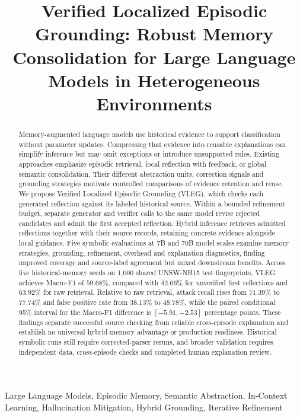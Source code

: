 \documentclass[onecolumn]{IEEEtran}
\numberwithin{equation}{section}
\theoremstyle{definition}
\theoremstyle{remark}
\begin{document}
\title{Verified Localized Episodic Grounding: Robust Memory Consolidation for Large Language Models in Heterogeneous Environments}
\author{}

\maketitle

\begin{abstract}
Memory-augmented language models use historical evidence to support classification without parameter updates. Compressing that evidence into reusable explanations can simplify inference but may omit exceptions or introduce unsupported rules. Existing approaches emphasize episodic retrieval, local reflection with feedback, or global semantic consolidation. Their different abstraction units, correction signals and grounding strategies motivate controlled comparisons of evidence retention and reuse. We propose Verified Localized Episodic Grounding (VLEG), which checks each generated reflection against its labeled historical source. Within a bounded refinement budget, separate generator and verifier calls to the same model revise rejected candidates and admit the first accepted reflection. Hybrid inference retrieves admitted reflections together with their source records, retaining concrete evidence alongside local guidance. Five symbolic evaluations at 7B and 70B model scales examine memory strategies, grounding, refinement, overhead and explanation diagnostics, finding improved coverage and source-label agreement but mixed downstream benefits. Across five historical-memory seeds on 1,000 shared UNSW-NB15 test fingerprints, VLEG achieves Macro-F1 of $59.68\%$, compared with $42.66\%$ for unverified first reflections and $63.92\%$ for raw retrieval. Relative to raw retrieval, attack recall rises from $71.39\%$ to $77.74\%$ and false positive rate from $38.13\%$ to $48.78\%$, while the paired conditional 95\% interval for the Macro-F1 difference is $[-5.91,-2.53]$ percentage points. These findings separate successful source checking from reliable cross-episode explanation and establish no universal hybrid-memory advantage or production readiness. Historical symbolic runs still require corrected-parser reruns, and broader validation requires independent data, cross-episode checks and completed human explanation review.
\end{abstract}

\begin{IEEEkeywords}
Large Language Models, Episodic Memory, Semantic Abstraction, In-Context Learning, Hallucination Mitigation, Hybrid Grounding, Iterative Refinement
\end{IEEEkeywords}
\end{document}
